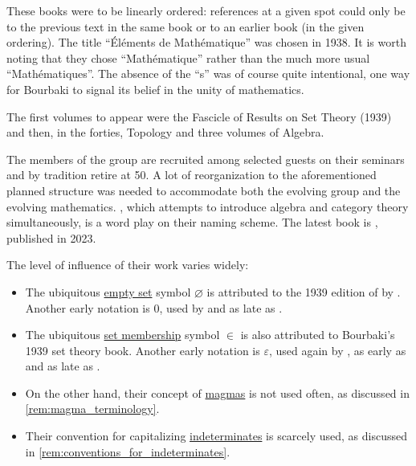 \begin{remark}
\begin{displayquote}
    These books were to be linearly ordered: references at a given spot could only be to the previous text in the same book or to an earlier book (in the given ordering). The title \enquote{\'El\'ements de Math\'ematique} was chosen in 1938. It is worth noting that they chose \enquote{Math\'ematique} rather than the much more usual \enquote{Math\'ematiques}. The absence of the \enquote{s} was of course quite intentional, one way for Bourbaki to signal its belief in the unity of mathematics.

    The first volumes to appear were the Fascicle of Results on Set Theory (1939) and then, in the forties, Topology and three volumes of Algebra.
  \end{displayquote}

  The members of the group are recruited among selected guests on their seminars and by tradition retire at 50. A lot of reorganization to the aforementioned planned structure was needed to accommodate both the evolving group and the evolving mathematics. , which attempts to introduce algebra and category theory simultaneously, is a word play on their naming scheme. The latest book is \cite{Bourbaki2023ThéoriesSpectrales3à5}, published in 2023.

  The level of influence of their work varies widely:
  \begin{itemize}
    \item The ubiquitous \hyperref[def:empty_set]{empty set} symbol \( \varnothing \) is attributed to the 1939 edition of \cite[E II.1]{Bourbaki1970ThéorieDesEnsembles} by \cite{Miller2019EarliestUsesOfLogicSymbols}. Another early notation is \( 0 \), used by  and as late as .

    \item The ubiquitous \hyperref[def:naive_set_theory]{set membership} symbol \( {\in} \) is also attributed to Bourbaki's 1939 set theory book. Another early notation is \( \varepsilon \), used again by , as early as  and as late as .

    \item On the other hand, their concept of \hyperref[rem:magma_terminology]{magmas} is not used often, as discussed in \cref{rem:magma_terminology}.

    \item Their convention for capitalizing \hyperref[con:indeterminate]{indeterminates} is scarcely used, as discussed in \cref{rem:conventions_for_indeterminates}.
  \end{itemize}


\end{remark}
